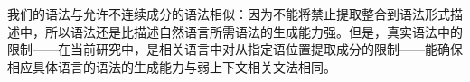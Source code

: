    我们的语法与允许不连续成分的语法相似：因为不能将禁止提取整合到语法形式描述中，所以语法还是比描述自然语言所需语法的生成能力强。但是，真实语法中的限制——在当前研究中，是相关语言中对从指定语位置提取成分的限制——能确保相应具体语言的语法的生成能力与弱上下文相关文法相同。



